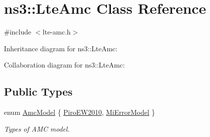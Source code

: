 \hypertarget{classns3_1_1LteAmc}{}\section{ns3\+:\+:Lte\+Amc Class Reference}
\label{classns3_1_1LteAmc}


{\ttfamily \#include $<$lte-\/amc.\+h$>$}



Inheritance diagram for ns3\+:\+:Lte\+Amc\+:


Collaboration diagram for ns3\+:\+:Lte\+Amc\+:
\subsection*{Public Types}
\begin{DoxyCompactItemize}
\item 
enum \hyperlink{classns3_1_1LteAmc_a2b3b1ed166e80211de82407dea40c157}{Amc\+Model} \{ \hyperlink{classns3_1_1LteAmc_a2b3b1ed166e80211de82407dea40c157acc4aadfc04b5e099e8e0503e2f1ca049}{Piro\+E\+W2010}, 
\hyperlink{classns3_1_1LteAmc_a2b3b1ed166e80211de82407dea40c157a37312af64915edb35634cf5920702eda}{Mi\+Error\+Model}
 \}\begin{DoxyCompactList}\small\item\em Types of A\+MC model. \end{DoxyCompactList}
\end{DoxyCompactItemize}
